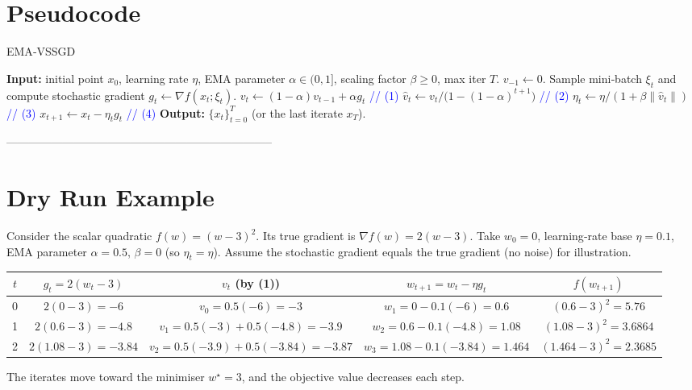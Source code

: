 \documentclass{article}
\newcommand{\grad}{\nabla}
\begin{document}
\section*{Pseudocode}
\begin{algorithm}[H]
\caption{EMA‑VSSGD}
\begin{algorithmic}[1]
\STATE \textbf{Input:} initial point $x_{0}$, learning rate $\eta$, EMA parameter $\alpha\in(0,1]$, scaling factor $\beta\ge0$, max iter $T$.
\STATE $v_{-1}\leftarrow 0$.
    \STATE Sample mini‑batch $\xi_{t}$ and compute stochastic gradient $g_{t}\gets\grad f(x_{t};\xi_{t})$.
    \STATE $v_{t}\gets (1-\alpha)v_{t-1}+\alpha g_{t}$ \hfill\textcolor{blue}{// (1)}
    \STATE $\hat v_{t}\gets v_{t}/\bigl(1-(1-\alpha)^{t+1}\bigr)$ \hfill\textcolor{blue}{// (2)}
    \STATE $\eta_{t}\gets \eta/(1+\beta\|\hat v_{t}\|)$ \hfill\textcolor{blue}{// (3)}
    \STATE $x_{t+1}\gets x_{t}-\eta_{t} g_{t}$ \hfill\textcolor{blue}{// (4)}
\ENDFOR
\STATE \textbf{Output:} $\{x_{t}\}_{t=0}^{T}$ (or the last iterate $x_{T}$).
\end{algorithmic}
\end{algorithm}

-----------------------------------------------------------------------

\section*{Dry Run Example}
Consider the scalar quadratic $f(w)=(w-3)^{2}$.  
Its true gradient is $\grad f(w)=2(w-3)$.  
Take $w_{0}=0$, learning‑rate base $\eta=0.1$, EMA parameter $\alpha=0.5$, $\beta=0$ (so $\eta_{t}=\eta$).  
Assume the stochastic gradient equals the true gradient (no noise) for illustration.

\begin{center}
\begin{tabular}{c|c|c|c|c}
$t$ & $g_{t}=2(w_{t}-3)$ & $v_{t}$ (by (1)) & $w_{t+1}=w_{t}-\eta g_{t}$ & $f(w_{t+1})$\\ \hline
0 & $2(0-3)=-6$ & $v_{0}=0.5(-6)=-3$ & $w_{1}=0-0.1(-6)=0.6$ & $(0.6-3)^{2}=5.76$\\
1 & $2(0.6-3)=-4.8$ & $v_{1}=0.5(-3)+0.5(-4.8)=-3.9$ & $w_{2}=0.6-0.1(-4.8)=1.08$ & $(1.08-3)^{2}=3.6864$\\
2 & $2(1.08-3)=-3.84$ & $v_{2}=0.5(-3.9)+0.5(-3.84)=-3.87$ & $w_{3}=1.08-0.1(-3.84)=1.464$ & $(1.464-3)^{2}=2.3685$
\end{tabular}
\end{center}
The iterates move toward the minimiser $w^{\star}=3$, and the objective value decreases each step.
\end{document}

